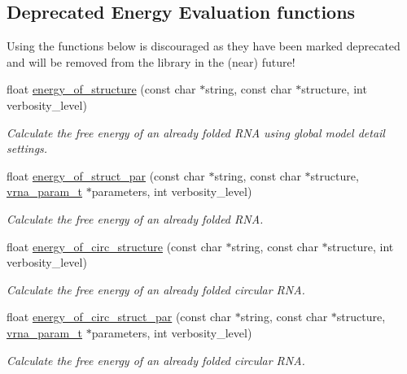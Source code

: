 \subsection*{Deprecated Energy Evaluation functions}
\label{_amgrp350f64f578ad95493f83500bcd6ab81f}%
Using the functions below is discouraged as they have been marked deprecated and will be removed from the library in the (near) future! \begin{DoxyCompactItemize}
\item 
float \hyperlink{group__eval_gaf93986cb3cb29770ec9cca69c9fab8cf}{energy\+\_\+of\+\_\+structure} (const char $\ast$string, const char $\ast$structure, int verbosity\+\_\+level)
\begin{DoxyCompactList}\small\item\em Calculate the free energy of an already folded R\+NA using global model detail settings. \end{DoxyCompactList}\item 
float \hyperlink{group__eval_gaf9d064d3c496de42eca6734a96fd2090}{energy\+\_\+of\+\_\+struct\+\_\+par} (const char $\ast$string, const char $\ast$structure, \hyperlink{group__energy__parameters_ga8a69ca7d787e4fd6079914f5343a1f35}{vrna\+\_\+param\+\_\+t} $\ast$parameters, int verbosity\+\_\+level)
\begin{DoxyCompactList}\small\item\em Calculate the free energy of an already folded R\+NA. \end{DoxyCompactList}\item 
float \hyperlink{group__eval_gaeb14f3664aec67fc03268ac75253f0f8}{energy\+\_\+of\+\_\+circ\+\_\+structure} (const char $\ast$string, const char $\ast$structure, int verbosity\+\_\+level)
\begin{DoxyCompactList}\small\item\em Calculate the free energy of an already folded circular R\+NA. \end{DoxyCompactList}\item 
float \hyperlink{group__eval_ga3f01f9744ba6a40555eb4d81fc77f6df}{energy\+\_\+of\+\_\+circ\+\_\+struct\+\_\+par} (const char $\ast$string, const char $\ast$structure, \hyperlink{group__energy__parameters_ga8a69ca7d787e4fd6079914f5343a1f35}{vrna\+\_\+param\+\_\+t} $\ast$parameters, int verbosity\+\_\+level)
\begin{DoxyCompactList}\small\item\em Calculate the free energy of an already folded circular R\+NA. \end{DoxyCompactList}\item 

\end{DoxyCompactItemize}
